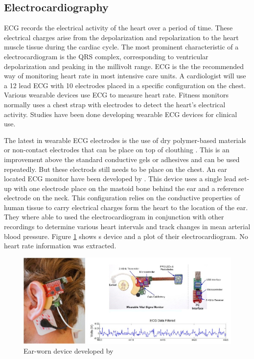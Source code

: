 \subsection{Electrocardiography}
ECG records the electrical activity of the heart over a period of time. These electrical charges arise from the depolarization and repolarization to the heart muscle tissue during the cardiac cycle. The most prominent characteristic of a electrocardiogram is the QRS complex, corresponding to ventricular depolarization and peaking in the millivolt range. ECG is the the recommended way of monitoring heart rate in most intensive care units. A cardiologist will use a 12 lead ECG with 10 electrodes placed in a specific configuration on the chest. Various wearable devices use ECG to measure heart rate. Fitness monitors normally uses a chest strap with electrodes to detect the heart's electrical activity. Studies have been done developing wearable ECG devices for clinical use.

\medskip

The latest in wearable ECG electrodes is the use of dry polymer-based materials \citep{wang2010wearable} or non-contact electrodes that can be place on top of clouthing \citep{lin2013development}. This is an improvement above the standard conductive gels or adhesives and can be used repeatedly. But these electrods still needs to be place on the chest. An ear located ECG monitor have been developed by \cite{winokur2012wearable}. This device uses a single lead set-up with one electrode place on the mastoid bone behind the ear and a reference electrode on the neck. This configuration relies on the conductive properties of human tissue to carry electrical charges form the heart to the location of the ear. They where able to used the electrocardiogram in conjunction with other recordings to determine various heart intervals and track changes in mean arterial blood pressure. Figure \ref{fig:Winokur} shows \cite{winokur2012wearable} s device and a plot of their electrocardiogram. No heart rate information was extracted.

\begin{figure}[h]
   \centering
   \includegraphics[scale=0.65]{figs/Winokur}
   \caption{Ear-worn device developed by \cite{winokur2012wearable}}
   \label{fig:Winokur}
\end{figure}


